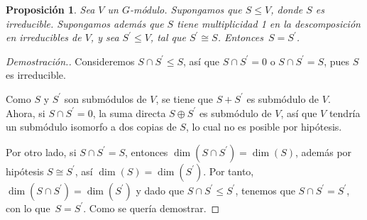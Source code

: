 \documentclass[12pt]{book}
\newtheorem{proposition}[theorem]{Proposición}
\theoremstyle{definition}
\newcounter{in}
\newcounter{ini}
\begin{document}

\begin{proposition}
  \label{modulos-iguales}
  Sea $V$ un $G$-módulo. Supongamos que $S\leq V$, donde $S$ es irreducible. Supongamos
  además que $S$ tiene multiplicidad 1 en la descomposición en
  irreducibles de $V$, y sea $S^{'}\leq V$, tal que $S^{'}\cong S$. Entonces~$S=S^{'}$.
\end{proposition}

\begin{proof}[Demostración.]
  Consideremos $S\cap S^{'}\leq S$, así que $S\cap S^{'}=0$ o $S\cap
  S^{'}=S$, pues $S$ es irreducible.

  Como $S$ y $S^{'}$ son submódulos de $V$, se tiene que $S+S^{'}$ es submódulo de $V$. Ahora, si
  $S\cap S^{'}=0$, la suma directa $S\oplus S^{'}$ es submódulo de $V$, 
  así que $V$ tendría un submódulo isomorfo a dos copias de $S$, lo cual
  no es posible por hipótesis. 

  Por otro lado, si $S\cap S^{'}=S$, entonces $\dim (S\cap S^{'})=\dim(S)$, además por hipótesis $S\cong S^{'}$, así
  $\dim(S)=\dim(S^{'})$. Por tanto, $\dim(S\cap S^{'})=\dim(S^{'})$ y
  dado que $S\cap S^{'}\leq S^{'}$, %
  tenemos que $S\cap S^{'}=S^{'}$, con lo que~$S=S^{'}$. Como se quería
  demostrar.
\end{proof}
\end{document}

